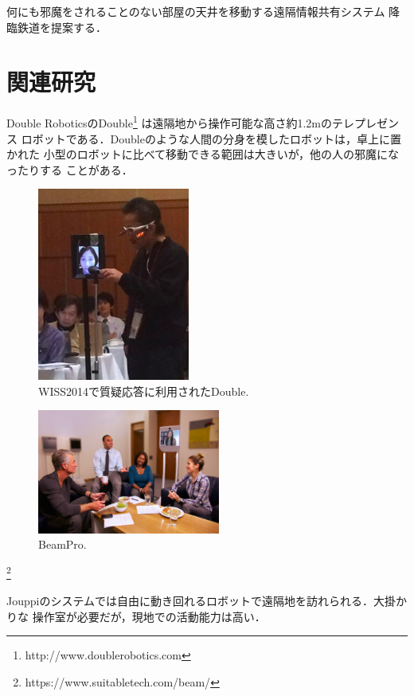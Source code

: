 \documentclass[submit,techreq]{ipsj}
\begin{document}
何にも邪魔をされることのない部屋の天井を移動する遠隔情報共有システム
降臨鉄道を提案する．

\section{関連研究}

Double RoboticsのDouble\footnote{
  \textsf{http://www.doublerobotics.com}
}
は遠隔地から操作可能な高さ約1.2mのテレプレゼンス
ロボットである．Doubleのような人間の分身を模したロボットは，卓上に置かれた
小型のロボットに比べて移動できる範囲は大きいが，他の人の邪魔になったりする
ことがある．

\begin{figure}[H]
\centerline{\includegraphics[width=50mm]{figures/b74f4564d4b38d12e48fcf80fef96def.png}}
\caption{WISS2014で質疑応答に利用されたDouble.}
\label{double}
\end{figure}

\begin{figure}[H]
\centerline{\includegraphics[width=60mm]{figures/2c092d5d4467d5b2572acef0c95b22ff.png}}
\caption{BeamPro.}
\label{beampro}
\end{figure}

\footnote{
  \textsf{https://www.suitabletech.com/beam/}
}

Jouppiのシステム\cite{Jouppi:2002:FST:587078.587128}では自由に動き回れるロボットで遠隔地を訪れられる．大掛かりな
操作室が必要だが，現地での活動能力は高い．
\end{document}

